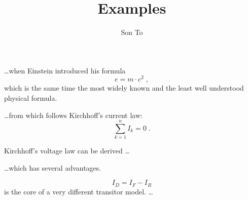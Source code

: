 \documentclass[a4paper]{report}
\title{Examples}
\author{Son To}
\begin{document}
\maketitle
  \ldots when Einstein introduced his formula
  \begin{equation}
    e = m \cdot c^2 \; ,
  \end{equation}
  which is the same time the most widely known
  and the least well understood physical formula.

  \ldots from which follows Kirchhoff's current law:
  \begin{equation}
    \sum_{k=1}^{n} I_k = 0 \; .
  \end{equation}

  Kirchhoff's voltage law can be derived \ldots

  \ldots which has several advantages.

  \begin{equation}
    I_D = I_F - I_R
  \end{equation}
  is the core of a very different transitor model. \ldots
\end{document}

